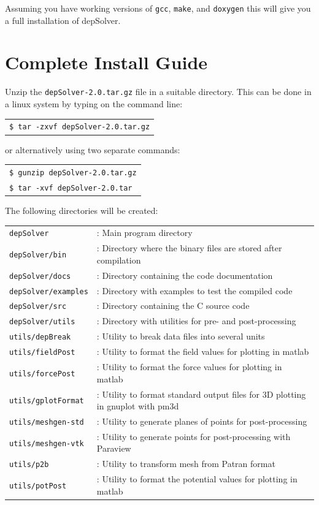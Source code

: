 \documentclass[12pt]{report}
\begin{document}
Assuming you have working versions of \verb+gcc+, \verb+make+, and \verb+doxygen+ this will give you a full installation of depSolver.


\section{Complete Install Guide}
Unzip the \verb+depSolver-2.0.tar.gz+ file in a suitable directory. This can be done in a linux system by typing on the command line:

\begin{tabular}{l}
\texttt{\$ tar -zxvf depSolver-2.0.tar.gz}
\end{tabular}

or alternatively using two separate commands:

\begin{tabular}{l}
\texttt{\$ gunzip depSolver-2.0.tar.gz}\\
\texttt{\$ tar -xvf depSolver-2.0.tar}
\end{tabular}

The following directories will be created:

\begin{tabular}{ll}
\texttt{depSolver}&: Main program directory\\
\texttt{depSolver/bin}&: Directory where the binary files are stored after compilation\\
\texttt{depSolver/docs}&: Directory containing the code documentation\\
\texttt{depSolver/examples}&: Directory with examples to test the compiled code\\
\texttt{depSolver/src}&: Directory containing the C source code\\
\texttt{depSolver/utils}&: Directory with utilities for pre- and post-processing\\
\texttt{utils/depBreak}&: Utility to break data files into several units\\
\texttt{utils/fieldPost}&: Utility to format the field values for plotting in matlab\\
\texttt{utils/forcePost}&: Utility to format the force values for plotting in matlab\\
\texttt{utils/gplotFormat}&: Utility to format standard output files for 3D plotting in gnuplot with pm3d\\
\texttt{utils/meshgen-std}&: Utility to generate planes of points for post-processing\\
\texttt{utils/meshgen-vtk}&: Utility to generate points for post-processing with Paraview\\
\texttt{utils/p2b }&: Utility to transform mesh from Patran format\\
\texttt{utils/potPost}&: Utility to format the potential values for plotting in matlab\\
\end{tabular}
\end{document}
